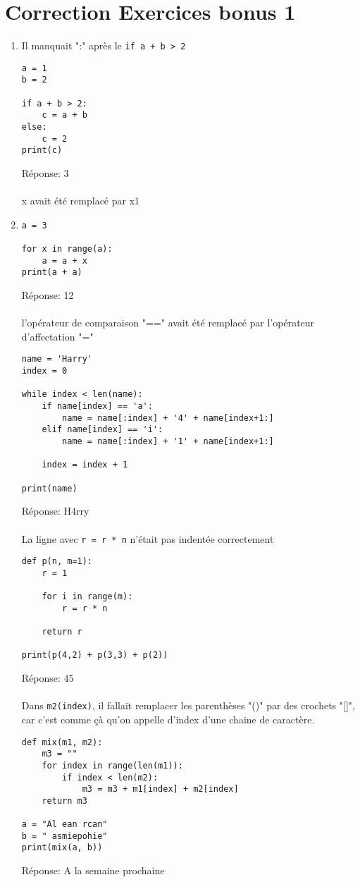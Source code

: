 \documentclass[12pt,a4paper]{article}
\newcommand{\codeintext}[1]{\texttt{#1}}
\newcommand{\response}[1]{Réponse: #1 \\\\}
\begin{document}
\section*{Correction Exercices bonus 1}

\begin{enumerate}

\item
Il manquait ":" après le \codeintext{if a + b > 2}
\begin{lstlisting}
a = 1
b = 2

if a + b > 2:
	c = a + b
else:
	c = 2
print(c)
\end{lstlisting}
\response{3}

x avait été remplacé par x1
\item
\begin{lstlisting}
a = 3

for x in range(a):
	a = a + x
print(a + a)   
\end{lstlisting}
\response{12}


l'opérateur de comparaison "==" avait été remplacé par l'opérateur d'affectation "="
\begin{lstlisting}
name = 'Harry'
index = 0

while index < len(name):
	if name[index] == 'a':
		name = name[:index] + '4' + name[index+1:]
	elif name[index] == 'i':
		name = name[:index] + '1' + name[index+1:]

	index = index + 1

print(name)
\end{lstlisting}
\response{H4rry}


La ligne avec \codeintext{r = r * n} n'était pas indentée correctement
\begin{lstlisting}
def p(n, m=1):
	r = 1
	
	for i in range(m):
		r = r * n

	return r

print(p(4,2) + p(3,3) + p(2)) 
\end{lstlisting}
\response{45}

Dans \codeintext{m2(index)}, il fallait remplacer les parenthèses "()" par des crochets "[]", car c'est comme çà qu'on appelle d'index d'une chaine de caractère.
\begin{lstlisting}
def mix(m1, m2):
	m3 = ""
	for index in range(len(m1)):
		if index < len(m2):
			m3 = m3 + m1[index] + m2[index]
	return m3
	
a = "Al ean rcan"
b = " asmiepohie"
print(mix(a, b)) 	

\end{lstlisting}
\response{A la semaine prochaine}

\end{enumerate}
\end{document}
